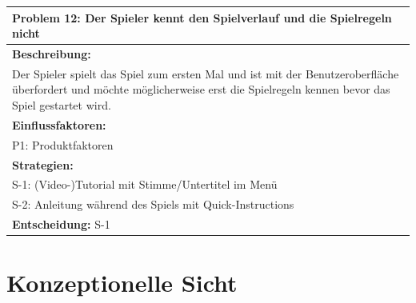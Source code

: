 \documentclass[fontsize=12pt,paper=a4,twoside]{scrartcl}
\begin{document}
\begin{longtable}{|p{15cm}|}
\hline
Problem 12: Der Spieler kennt den Spielverlauf und die Spielregeln nicht                                                                     
\\ \hline                                                                                                                                                                                                                                                                                                                                                                                                                                                                                                                                                        
\textbf{Beschreibung:} \\
Der Spieler spielt das Spiel zum ersten Mal und ist mit der Benutzeroberfläche überfordert und möchte möglicherweise erst die Spielregeln kennen bevor das Spiel gestartet wird.
\\ \hline
\textbf{Einflussfaktoren:} \\
P1: Produktfaktoren
\\ \hline
\textbf{Strategien:} \\
S-1: (Video-)Tutorial mit Stimme/Untertitel im Menü \\
S-2: Anleitung während des Spiels mit Quick-Instructions
 \\ \hline
 \textbf{Entscheidung:} S-1
\\ \hline
\end{longtable}

\section{Konzeptionelle Sicht} \label{sec:konzeptionell}
\end{document}
